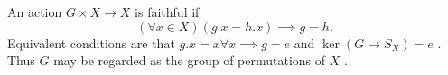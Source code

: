 An action  $ G \times X \rightarrow X $  is faithful if
 \[( \forall x \in X)(g.x=h.x) \implies g=h. \] Equivalent conditions are
that  $ g.x=x   \forall x \implies g=e $  and  $  \ker(G \rightarrow S_X)=e $ .
Thus  $ G $  may be regarded as the group of
permutations of  $ X $ .


